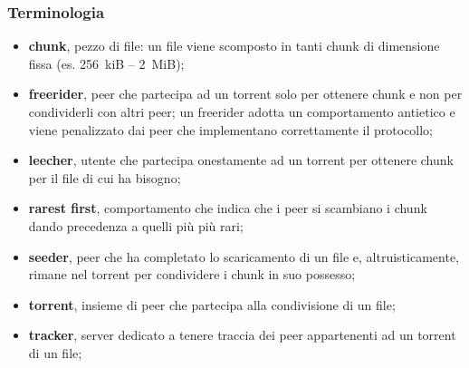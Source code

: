 \documentclass[12pt,a4paper]{article}
\begin{document}
\subsubsection{Terminologia}
\begin{itemize}
  \item \textbf{chunk}, pezzo di file: un file viene scomposto in tanti
    chunk di dimensione fissa (es. 256~kiB -- 2~MiB);
  \item \textbf{freerider}, peer che partecipa ad un torrent solo per
    ottenere chunk e non per condividerli con altri peer; un freerider
    adotta un comportamento antietico e viene penalizzato dai peer
    che implementano correttamente il protocollo;
  \item \textbf{leecher}, utente che partecipa onestamente ad un torrent
    per ottenere chunk per il file di cui ha bisogno;
  \item \textbf{rarest first}, comportamento che indica che i peer si
    scambiano i chunk dando precedenza a quelli più più rari;
  \item \textbf{seeder}, peer che ha completato lo scaricamento di un
    file e, altruisticamente, rimane nel torrent per condividere i chunk
    in suo possesso;
  \item \textbf{torrent}, insieme di peer che partecipa alla
    condivisione di un file;
  \item \textbf{tracker}, server dedicato a tenere traccia dei peer
    appartenenti ad un torrent di un file;
\end{itemize}
\end{document}
